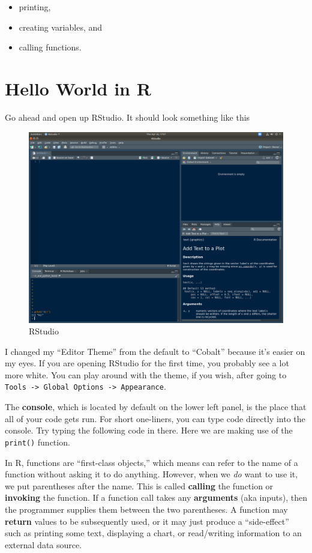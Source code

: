 \documentclass[
  12pt,
  krantz2]{krantz}
\providecommand{\tightlist}{%
  \setlength{\itemsep}{0pt}\setlength{\parskip}{0pt}}
\begin{document}
\begin{itemize}
\tightlist
\item
  printing,
\item
  creating variables, and
\item
  calling functions.
\end{itemize}

\hypertarget{hello-world-in-r}{%
\section{Hello World in R}\label{hello-world-in-r}}

Go ahead and open up RStudio. It should look something like this

\begin{figure}

{\centering \includegraphics[width=0.8\linewidth]{pics/rstudio} 

}

\caption{RStudio}\label{fig:rstudio}
\end{figure}

I changed my ``Editor Theme'' from the default to ``Cobalt'' because it's easier on my eyes. If you are opening RStudio for the first time, you probably see a lot more white. You can play around with the theme, if you wish, after going to \texttt{Tools\ -\textgreater{}\ Global\ Options\ -\textgreater{}\ Appearance}.

The \textbf{console}, which is located by default on the lower left panel, is the place that all of your code gets run. For short one-liners, you can type code directly into the console. Try typing the following code in there. Here we are making use of the \texttt{print()} function.

In R, functions are ``first-class objects,'' which means can refer to the name of a function without asking it to do anything. However, when we \emph{do} want to use it, we put parentheses after the name. This is called \textbf{calling} the function or \textbf{invoking} the function. If a function call takes any \textbf{arguments} (aka inputs), then the programmer supplies them between the two parentheses. A function may \textbf{return} values to be subsequently used, or it may just produce a ``side-effect'' such as printing some text, displaying a chart, or read/writing information to an external data source.
\end{document}
